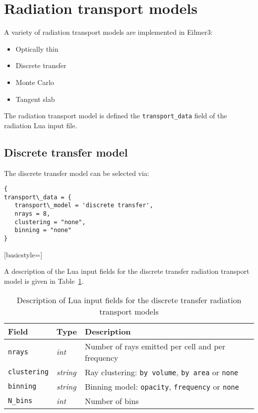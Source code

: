 \section{Radiation transport models}
\label{app:rt-models}

A variety of radiation transport models are implemented in Eilmer3:

\begin{itemize}
 \item Optically thin
 \item Discrete transfer
 \item Monte Carlo
 \item Tangent slab
\end{itemize}

The radiation transport model is defined the \texttt{transport\_data} field of the radiation Lua input file.

\subsection{Discrete transfer model}

The discrete transfer model can be selected via:

\noindent \topbar
\begin{lstlisting}[basicstyle=\ttfamily\normalsize]
{
transport\_data = {
   transport\_model = 'discrete transfer',
   nrays = 8,
   clustering = "none",
   binning = "none"
}
\end{lstlisting}[basicstyle=\ttfamily\normalsize]
\bottombar

A description of the Lua input fields for the discrete transfer radiation transport model is given in Table~\ref {tab:DTM-input}.

\begin{table}
 \begin{center}
  \caption{Description of Lua input fields for the discrete transfer radiation transport models}
  \label{tab:DTM-input}
\begin{tabular}{llp{6cm}}
 \hline \hline
 Field                        & Type              &  Description \\ \hline
\texttt{nrays}            & \textit{int}       &  Number of rays emitted per cell and per frequency \\
\texttt{clustering}    & \textit{string}  &  Ray clustering: \texttt{by volume}, \texttt{by area} or \texttt{none} \\
\texttt{binning}        & \textit{string}  &  Binning model: \texttt{opacity}, \texttt{frequency} or \texttt{none} \\
\texttt{N\_bins}         & \textit{int}       &  Number of bins \\
\hline
\end{tabular}
\end{center}
\end{table}